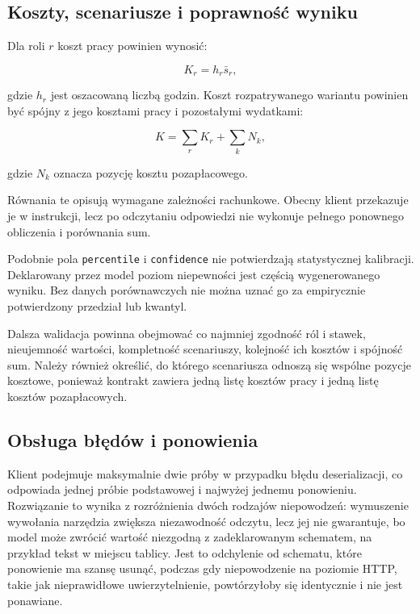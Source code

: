 \subsection{Koszty, scenariusze i poprawność wyniku}

Dla roli \(r\) koszt pracy powinien wynosić:

\begin{equation}
    K_r=h_r\bar{s}_r,
    \label{eq:koszt-pozycji}
\end{equation}

gdzie \(h_r\) jest oszacowaną liczbą godzin. Koszt rozpatrywanego wariantu powinien być spójny z jego kosztami pracy i pozostałymi wydatkami:

\begin{equation}
    K=
    \sum_r K_r+\sum_k N_k,
    \label{eq:koszt-suma}
\end{equation}

gdzie \(N_k\) oznacza pozycję kosztu pozapłacowego.

Równania te opisują wymagane zależności rachunkowe. Obecny klient przekazuje je w instrukcji, lecz po odczytaniu odpowiedzi nie wykonuje pełnego ponownego obliczenia i porównania sum.

Podobnie pola \texttt{percentile} i \texttt{confidence} nie potwierdzają statystycznej kalibracji. Deklarowany przez model poziom niepewności jest częścią wygenerowanego wyniku. Bez danych porównawczych nie można uznać go za empirycznie potwierdzony przedział lub kwantyl.

Dalsza walidacja powinna obejmować co najmniej zgodność ról i stawek, nieujemność wartości, kompletność scenariuszy, kolejność ich kosztów i spójność sum. Należy również określić, do którego scenariusza odnoszą się wspólne pozycje kosztowe, ponieważ kontrakt zawiera jedną listę kosztów pracy i jedną listę kosztów pozapłacowych.

\subsection{Obsługa błędów i ponowienia}

Klient podejmuje maksymalnie dwie próby w przypadku błędu deserializacji, co odpowiada jednej próbie podstawowej i najwyżej jednemu ponowieniu. Rozwiązanie to wynika z rozróżnienia dwóch rodzajów niepowodzeń: wymuszenie wywołania narzędzia zwiększa niezawodność odczytu, lecz jej nie gwarantuje, bo model może zwrócić wartość niezgodną z zadeklarowanym schematem, na przykład tekst w miejscu tablicy. Jest to odchylenie od schematu, które ponowienie ma szansę usunąć, podczas gdy niepowodzenie na poziomie HTTP, takie jak nieprawidłowe uwierzytelnienie, powtórzyłoby się identycznie i nie jest ponawiane.

